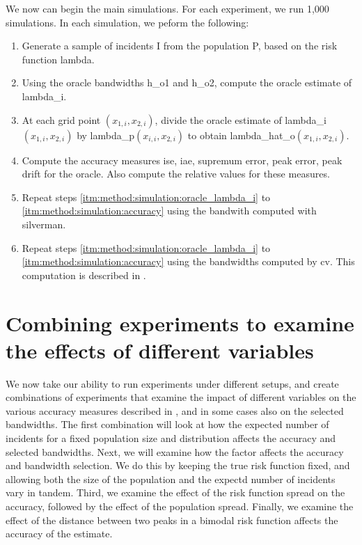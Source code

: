 We now can begin the main simulations.
For each experiment, we run 1,000 simulations.
In each simulation, we peform the following:
\begin{enumerate}
    \item\label{itm:method:simulation:generate} Generate a sample of incidents \gls{I} from the population \gls{P}, based on the risk function \gls{lambda}.
    \item\label{itm:method:simulation:oracle_lambda_i} Using the \gls{oracle} bandwidths \gls{h_o1} and \gls{h_o2}, compute the \gls{oracle} estimate of \gls{lambda_i}.
    \item\label{itm:method:simulation:oracle_lambda_hat} At each grid point $(x_{1,i}, x_{2,i})$, divide the oracle estimate of \gls{lambda_i}$(x_{1,i}, x_{2,i})$ by \gls{lambda_p}$(x_{i,i}, x_{2,i})$ to obtain \gls{lambda_hat_o}$(x_{1,i}, x_{2,i})$.
    \item\label{itm:method:simulation:accuracy} Compute the accuracy measures \gls{ise}, \gls{iae}, \gls{supremum error}, \gls{peak error}, \gls{peak drift} for the \gls{oracle}.
    Also compute the relative values for these measures.
    \item\label{itm:method:simulation:silverman_lambda_i} Repeat steps \ref{itm:method:simulation:oracle_lambda_i} to \ref{itm:method:simulation:accuracy} using the bandwith computed with \gls{silverman}.
    \item\label{itm:method:simulation:cv_lambda_i} Repeat steps \ref{itm:method:simulation:oracle_lambda_i} to \ref{itm:method:simulation:accuracy} using the bandwidths computed by \gls{cv}.
    This computation is described in .
\end{enumerate}

\section[Combining experiments]{Combining experiments to examine the effects of different variables}
\label{sec:method:combining_experiments}

We now take our ability to run experiments under different setups,
and create combinations of experiments that examine the impact of different variables on the various accuracy measures described in ,
and in some cases also on the selected bandwidths.
The first combination will look at how the expected number of incidents for a fixed population size and distribution affects the accuracy and selected bandwidths.
Next, we will examine how the \gls{factor} affects the accuracy and bandwidth selection.
We do this by keeping the true risk function fixed, and allowing both the size of the population and the expectd number of incidents vary in tandem.
Third, we examine the effect of the risk function spread on the accuracy, followed by the effect of the population spread.
Finally, we examine the effect of the distance between two peaks in a bimodal risk function affects the accuracy of the estimate.

